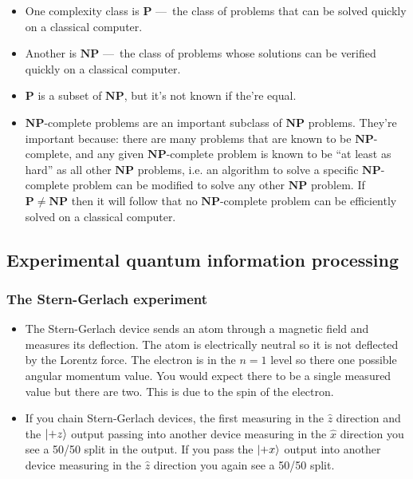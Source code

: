 \documentclass{article}
\begin{document}
\begin{itemize}
  \item One complexity class is $\mathbf{P}$ — the class of problems that can be solved quickly on a classical computer.

  \item Another is $\mathbf{NP}$ — the class of problems whose solutions can be verified quickly on a classical computer.

  \item $\mathbf{P}$ is a subset of $\mathbf{NP}$, but it's not known if the're equal.

  \item $\mathbf{NP}$-complete problems are an important subclass of $\mathbf{NP}$ problems. They're important because: there are many problems that are known to be $\mathbf{NP}$-complete, and any given $\mathbf{NP}$-complete problem is known to be ``at least as hard'' as all other $\mathbf{NP}$ problems, i.e. an algorithm to solve a specific $\mathbf{NP}$-complete problem can be modified to solve any other $\mathbf{NP}$ problem. If $\mathbf{P} \ne \mathbf{NP}$ then it will follow that no $\mathbf{NP}$-complete problem can be efficiently solved on a classical computer.
\end{itemize}

\subsection{Experimental quantum information processing}

\subsubsection{The Stern-Gerlach experiment}

\begin{itemize}
  \item The Stern-Gerlach device sends an atom through a magnetic field and measures its deflection. The atom is electrically neutral so it is not deflected by the Lorentz force. The electron is in the $n = 1$ level so there one possible angular momentum value. You would expect there to be a single measured value but there are two. This is due to the spin of the electron.

  \item If you chain Stern-Gerlach devices, the first measuring in the $\hat{z}$ direction and the $\ket{+z}$ output passing into another device measuring in the $\hat{x}$ direction you see a 50/50 split in the output. If you pass the $\ket{+x}$ output into another device measuring in the $\hat{z}$ direction you again see a 50/50 split.
\end{itemize}
\end{document}
